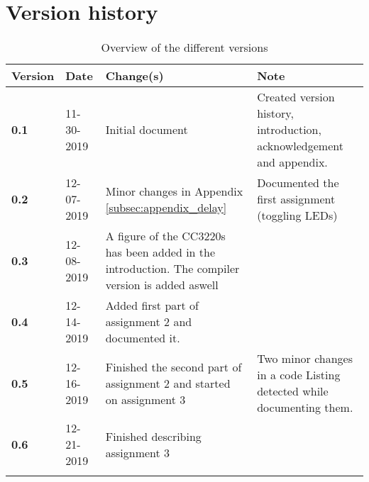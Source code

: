 \section*{Version history}


\begin{longtable}{| p{} | p{} | p{} | p{} |}

    \hline
    \textcolor{darkpink}{Version} & \textcolor{darkpink}{Date} & \textcolor{darkpink}{Change(s)} & \textcolor{darkpink}{Note} \\
     
    \hline
    \textbf{0.1} & 11-30-2019 & Initial document & Created version history, introduction, acknowledgement and appendix. \\

    \hline

    \textbf{0.2} & 12-07-2019 & Minor changes in Appendix \ref{subsec:appendix_delay} & Documented the first assignment (toggling LEDs) \\

    \hline

    \textbf{0.3} & 12-08-2019 & A figure of the CC3220s has been added in the introduction. The compiler version is added aswell & \\
    \hline

    \textbf{0.4} & 12-14-2019 & Added first part of assignment 2 and documented it. & \\

    \hline

    \textbf{0.5} & 12-16-2019 & Finished the second part of assignment 2 and started on assignment 3 & Two minor changes in a code Listing detected while documenting them. \\

    \hline

    \textbf{0.6} & 12-21-2019 & Finished describing assignment 3 &\\

    \hline


    \caption{Overview of the different versions}
    \label{tab:version}

\end{longtable}
